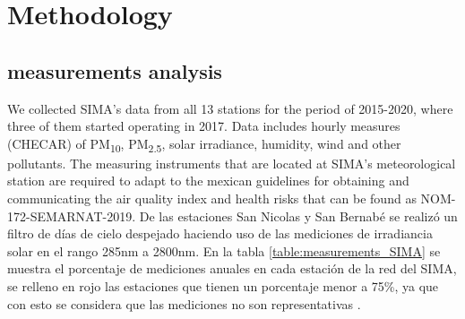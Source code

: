 \section{Methodology}
\subsection{measurements analysis}
We collected SIMA’s data from all 13 stations for the period of 2015-2020, where three of them
started operating in 2017. Data includes hourly measures (CHECAR) of PM\textsubscript{10}, PM\textsubscript{2.5},
solar irradiance, humidity, wind and other pollutants. The measuring instruments that are located at SIMA’s
meteorological station are required to adapt to the mexican guidelines for obtaining and communicating the
air quality index and health risks that can be found as NOM-172-SEMARNAT-2019. De las estaciones San Nicolas
y San Bernabé se realizó un filtro de días de cielo despejado haciendo uso de las mediciones de irradiancia
solar en el rango 285nm a 2800nm. En la tabla \ref{table:measurements_SIMA} se muestra el porcentaje de mediciones anuales en cada estación de la red 
del SIMA, se relleno en rojo las estaciones que tienen un porcentaje menor a 75\%, ya que con esto se considera que
las mediciones no son representativas \cite{molina2019}.


